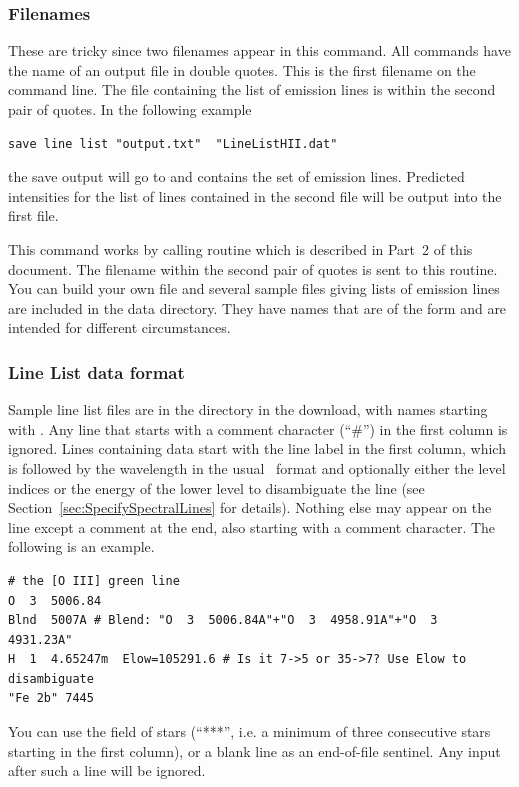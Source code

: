 \subsubsection{Filenames}  
These are tricky since two filenames appear in this command.
All  commands have the name of an output file
in double quotes.
This is the first filename on the command line.
The file containing the list
of emission lines is within the second pair of quotes.  In the following
example
\begin{verbatim}
save line list "output.txt"  "LineListHII.dat"
\end{verbatim}
the save output will go to 
and  contains the
set of emission lines.
Predicted intensities for the list of lines contained
in the second file will be output into the first file.
 
This command works by calling routine 
which is described in Part~2 of this document.
The filename within the second pair of quotes
is sent to this routine.
You can build your own file and several sample
files giving lists of emission lines are included in the data directory.
They have names that are of the form 
and are intended for different circumstances.

\subsubsection{Line List data format}
\label{sec:LineListDataFormat}

Sample line list files are in the  directory in the download, with
names starting with .
Any line that starts with a comment character (``\#'') in the first column is ignored.
Lines containing data start with the line label in the first column,
which is followed by the wavelength in the usual \Cloudy\ format
and optionally either the level indices or the energy of the lower level to disambiguate the line
(see Section~\ref{sec:SpecifySpectralLines} for details).
Nothing else may appear on the line except a comment at the end, also starting with a comment character.
The following is an example.
\begin{verbatim}
# the [O III] green line
O  3  5006.84
Blnd  5007A # Blend: "O  3  5006.84A"+"O  3  4958.91A"+"O  3  4931.23A"
H  1  4.65247m  Elow=105291.6 # Is it 7->5 or 35->7? Use Elow to disambiguate
"Fe 2b" 7445
\end{verbatim}
You can use the field of stars (``***'', i.e. a minimum of three consecutive stars
starting in the first column), or a blank line as an end-of-file sentinel. Any
input after such a line will be ignored.

